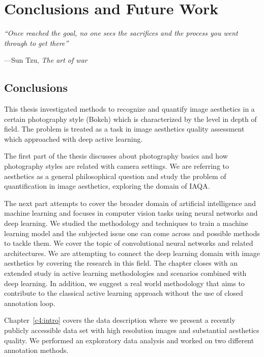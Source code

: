 \chapter{Conclusions and Future Work} \label{c6:extenstionsandfuturework}
\thispagestyle{empty}
\epigraph{\itshape ``Once reached the goal, no one sees the sacrifices and the process you went through to get there''}
{---Sun Tzu, \textit{The art of war}}


\section{Conclusions}

This thesis investigated methods to recognize and quantify image aesthetics in a certain photography style (Bokeh) which is characterized by the level in depth of field.
The problem is treated as a task in image aesthetics quality assessment which approached with deep active learning.

The first part of the thesis discusses about photography basics and how  photography styles are related with camera settings. We are referring to aesthetics as a general philosophical question and study the problem of quantification in image aesthetics, exploring the domain of IAQA.

The next part attempts to cover the broader domain of artificial intelligence and machine learning and focuses in computer vision tasks using neural networks and deep learning. We studied the methodology and techniques to train a machine learning model and the subjected issue one can come across and possible methods to tackle them. We cover the topic of convolutional neural networks and related architectures.
We are attempting to connect the deep learning domain with image aesthetics by covering the research in this field.
The chapter closes with an extended study in active learning methodologies and scenarios combined with deep learning. In addition, we suggest a real world methodology that aims to contribute to the classical active learning approach without the use of closed annotation loop.

Chapter~\ref{c4:intro} covers the data description where we present a recently publicly accessible data set with high resolution images and substantial aesthetics quality. We performed an exploratory data analysis and worked on two different annotation methods. 

